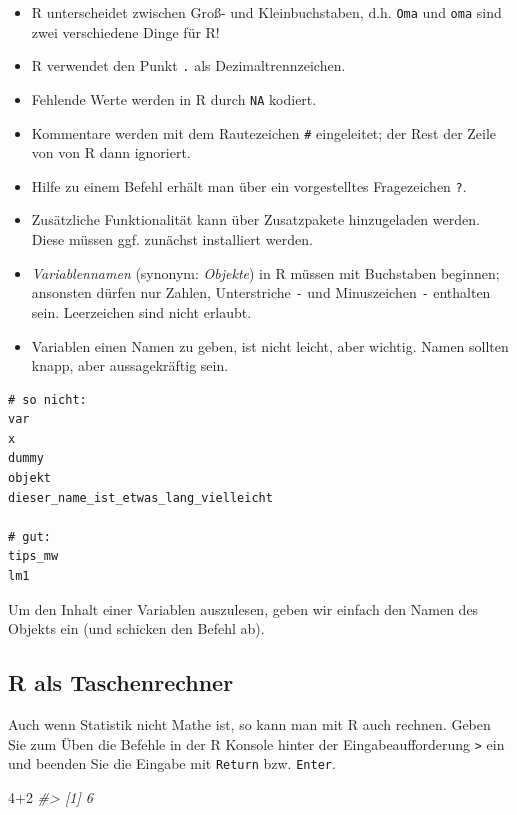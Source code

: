 \documentclass[12pt,ngerman,]{book}
\newenvironment{Shaded}{\begin{snugshade}}{\end{snugshade}}
\newcommand{\DecValTok}[1]{\textcolor[rgb]{0.00,0.00,0.81}{{#1}}}
\newcommand{\CommentTok}[1]{\textcolor[rgb]{0.56,0.35,0.01}{\textit{{#1}}}}
\providecommand{\tightlist}{%
  \setlength{\itemsep}{0pt}\setlength{\parskip}{0pt}}
\renewenvironment{Shaded}{\begin{kframe}}{\end{kframe}}
\begin{document}
\begin{itemize}
\tightlist
\item
  R unterscheidet zwischen Groß- und Kleinbuchstaben, d.h. \texttt{Oma}
  und \texttt{oma} sind zwei verschiedene Dinge für R!
\item
  R verwendet den Punkt \texttt{.} als Dezimaltrennzeichen.
\item
  Fehlende Werte werden in R durch \texttt{NA} kodiert.
\item
  Kommentare werden mit dem Rautezeichen \texttt{\#} eingeleitet; der
  Rest der Zeile von von R dann ignoriert.
\item
  Hilfe zu einem Befehl erhält man über ein vorgestelltes Fragezeichen
  \texttt{?}.
\item
  Zusätzliche Funktionalität kann über Zusatzpakete hinzugeladen werden.
  Diese müssen ggf. zunächst installiert werden.
\item
  \emph{Variablennamen} (synonym:
  \emph{Objekte}) in R müssen mit Buchstaben beginnen;
  ansonsten dürfen nur Zahlen, Unterstriche \texttt{-} und Minuszeichen
  \texttt{-} enthalten sein. Leerzeichen sind nicht erlaubt.
\item
  Variablen einen Namen zu geben, ist nicht leicht, aber wichtig. Namen
  sollten knapp, aber aussagekräftig sein.
\end{itemize}

\begin{verbatim}
# so nicht:
var
x
dummy
objekt
dieser_name_ist_etwas_lang_vielleicht

# gut:
tips_mw
lm1
\end{verbatim}

Um den Inhalt einer Variablen auszulesen, geben wir einfach den Namen
des Objekts ein (und schicken den Befehl ab).

\subsection{R als Taschenrechner}\label{r-als-taschenrechner}

Auch wenn Statistik nicht Mathe ist, so kann man mit R auch rechnen.
Geben Sie zum Üben die Befehle in der R Konsole hinter der
Eingabeaufforderung \texttt{\textgreater{}} ein und beenden Sie die
Eingabe mit \texttt{Return} bzw. \texttt{Enter}.

\begin{Shaded}
\begin{Highlighting}[]
\DecValTok{4+2} 
\CommentTok{#> [1] 6}
\end{Highlighting}
\end{Shaded}
\end{document}
